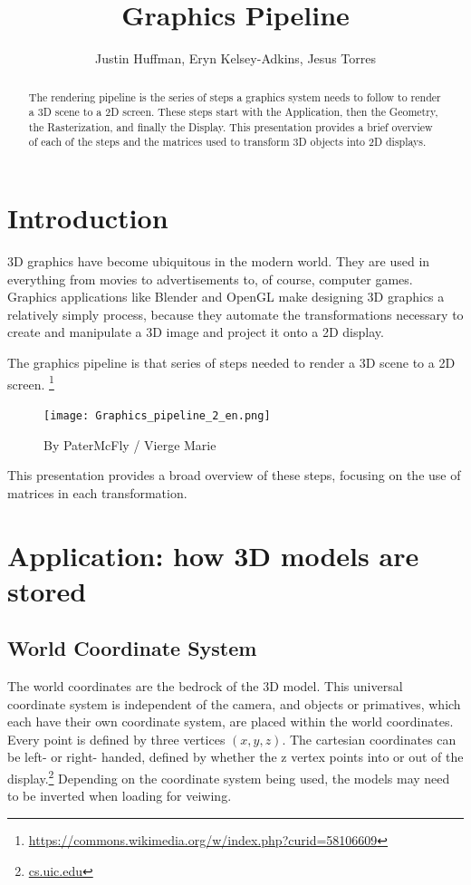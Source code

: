 \documentclass{article}
\begin{document}
\title{Graphics Pipeline}
\author{Justin Huffman, Eryn Kelsey-Adkins, Jesus Torres}

\maketitle

\begin{abstract}
The rendering pipeline is the series of steps a graphics system needs to follow to render a 3D scene to a 2D screen. These steps start with the Application, then the Geometry, the Rasterization, and finally the Display. This presentation provides a brief overview of each of the steps and the matrices used to transform 3D objects into 2D displays.
\end{abstract}

\section{Introduction}
3D graphics have become ubiquitous in the modern world. They are used in everything from movies to advertisements to, of course, computer games. Graphics applications like Blender and OpenGL make designing 3D graphics a relatively simply process, because they automate the transformations necessary to create and manipulate a 3D image and project it onto a 2D display.


The graphics pipeline is that series of steps needed to render a 3D scene to a 2D screen. \footnote{\url{https://commons.wikimedia.org/w/index.php?curid=58106609}}

\begin{figure}[H]
    \centering
    \texttt{[image: Graphics\_pipeline\_2\_en.png]}
    \caption{By PaterMcFly / Vierge Marie}
    \label{pipeline}
\end{figure} 

This presentation provides a broad overview of these steps, focusing on the use of matrices in each transformation.

\section{Application: how 3D models are stored}

\subsection{World Coordinate System}
The world coordinates are the bedrock of the 3D model. This universal coordinate system is independent of the camera, and objects or primatives, which each have their own coordinate system, are placed within the world coordinates. Every point is defined by three vertices $(x, y, z)$. The cartesian coordinates can be left- or right- handed, defined by whether the z vertex points into or out of the display.\footnote{\url{cs.uic.edu}} Depending on the coordinate system being used, the models may need to be inverted when loading for veiwing.
\end{document}
